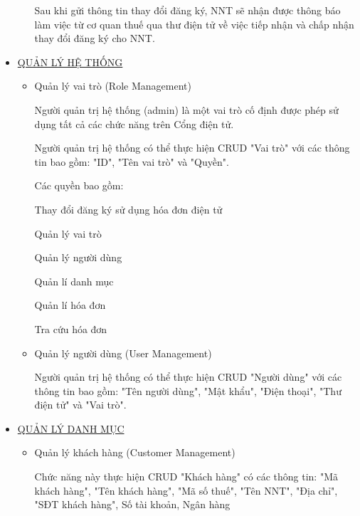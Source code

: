 \begin{itemize}
\begin{itemize}
                    Sau khi gửi thông tin thay đổi đăng ký, NNT sẽ nhận được thông báo làm việc từ cơ quan thuế qua thư điện tử về việc tiếp nhận và chấp nhận thay đổi đăng ký cho NNT.

          \end{itemize}

    \item \underline{QUẢN LÝ HỆ THỐNG}

          \begin{itemize}

              \item Quản lý vai trò (Role Management)

                    Người quản trị hệ thống (admin) là một vai trò cố định được phép sử dụng tất cả các chức năng trên Cổng điện tử.

                    Người quản trị hệ thống có thể thực hiện CRUD "Vai trò" với các thông tin bao gồm: "ID", "Tên vai trò" và "Quyền".

                    Các quyền bao gồm:

                    Thay đổi đăng ký sử dụng hóa đơn điện tử

                    Quản lý vai trò

                    Quản lý người dùng

                    Quản lí danh mục

                    Quản lí hóa đơn

                    Tra cứu hóa đơn

              \item Quản lý người dùng (User Management)

                    Người quản trị hệ thống có thể thực hiện CRUD "Người dùng" với các thông tin bao gồm: "Tên người dùng", "Mật khẩu", "Điện thoại", "Thư điện tử" và "Vai trò".

          \end{itemize}

    \item \underline{QUẢN LÝ DANH MỤC}

          \begin{itemize}

              \item Quản lý khách hàng (Customer Management)

                    Chức năng này thực hiện CRUD "Khách hàng" có các thông tin: "Mã khách hàng", "Tên khách hàng", "Mã số thuế", "Tên NNT", "Địa chỉ", "SĐT khách hàng", Số tài khoản, Ngân hàng


\end{itemize}
\end{itemize}
